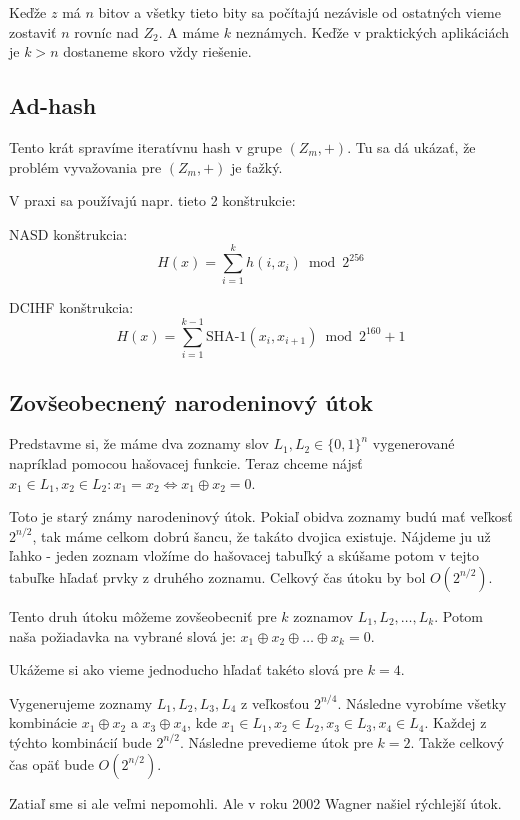Keďže $z$ má $n$ bitov a všetky tieto bity sa počítajú nezávisle od ostatných vieme
zostaviť $n$ rovníc nad $Z_2$. A máme $k$ neznámych. Keďže v praktických
aplikáciách je $k > n$ dostaneme skoro vždy riešenie.


\subsection{Ad-hash}

Tento krát spravíme iteratívnu hash v grupe $(Z_m, +)$.
Tu sa dá ukázať, že problém vyvažovania pre $(Z_m, +)$
je ťažký. 

V praxi sa používajú napr. tieto 2 konštrukcie:

NASD konštrukcia:
$$H(x) = \displaystyle\sum_{i=1}^k h(i, x_i) \bmod 2^{256}$$

DCIHF konštrukcia:
$$H(x) = \displaystyle\sum_{i=1}^{k-1} \textrm{SHA-1}(x_i, x_{i+1}) \bmod 2^{160}+1$$

\subsection{Zovšeobecnený narodeninový útok}

Predstavme si, že máme dva zoznamy slov $L_1, L_2 \in \{0,1\}^n$ vygenerované
napríklad pomocou hašovacej funkcie. Teraz chceme nájsť
$x_1 \in L_1, x_2 \in L_2\colon x_1 = x_2 \Leftrightarrow x_1 \oplus x_2 = 0$.

Toto je starý známy narodeninový útok. Pokiaľ obidva zoznamy budú mať veľkosť
$2^{n/2}$, tak máme celkom dobrú šancu, že takáto dvojica existuje. Nájdeme ju
už ľahko - jeden zoznam vložíme do hašovacej tabuľký a skúšame potom v tejto
tabuľke hľadať prvky z druhého zoznamu.
Celkový čas útoku by bol $O(2^{n/2})$.

Tento druh útoku môžeme zovšeobecniť pre $k$ zoznamov $L_1, L_2, \dots, L_k$.
Potom naša požiadavka na vybrané slová je: $x_1 \oplus x_2 \oplus \dots \oplus x_k = 0$.

Ukážeme si ako vieme jednoducho hľadať takéto slová pre $k=4$.

Vygenerujeme zoznamy $L_1, L_2, L_3, L_4$ z veľkosťou $2^{n/4}$. 
Následne vyrobíme všetky kombinácie $x_1 \oplus x_2$ a $x_3 \oplus x_4$, kde
$x_1 \in L_1, x_2 \in L_2, x_3 \in L_3, x_4 \in L_4$.
Každej z týchto kombinácií bude $2^{n/2}$. Následne prevedieme útok pre $k=2$.
Takže celkový čas opäť bude $O(2^{n/2})$.

Zatiaľ sme si ale veľmi nepomohli. Ale v roku 2002 Wagner \cite{birthday}
našiel rýchlejší útok.

